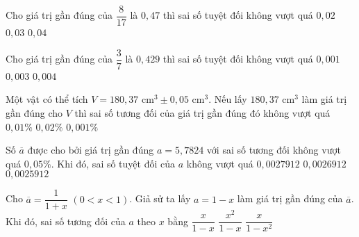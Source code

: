 \begin{ex}%
	Cho giá trị gần đúng của $\dfrac{8}{17}$ là $0{,}47$ thì sai số tuyệt đối không vượt quá 
	{$0{,}02$}
	{$0{,}03$}
	{$0{,}04$}
\end{ex}

\begin{ex}%
	Cho giá trị gần đúng của $\dfrac{3}{7}$ là $0{,}429$ thì sai số tuyệt đối không vượt quá 
	{\True $0{,}001$}
	{$ 0{,}003$}
	{$0{,}004$}
\end{ex}

\begin{ex}%
	Một vật có thể tích $V = 180{,}37 \text{\ cm}^3 \pm 0,05 \text{\ cm}^3$. Nếu lấy $180{,}37 \text{\ cm}^3$ làm giá trị gần đúng cho $V$ thì sai số tương đối của giá trị gần đúng đó không vượt quá 
	{$0{,}01 \%$}
	{$0{,}02 \%$}
	{$0{,}001 \%$}
\end{ex}

\begin{ex}%
	Số $\overline{a}$ được cho bởi giá trị gần đúng $a = 5{,}7824$ với sai số tương đối không vượt quá $0{,}05\%$. Khi đó, sai số tuyệt đối của $a$ không vượt quá
	{$0{,}0027912$}
	{$0{,}0026912$}
	{$0{,}0025912$}
\end{ex}

\begin{ex}%
	Cho $\overline{a} = \dfrac{1}{1+x}$ $(0 < x < 1)$. Giả sử ta lấy $a = 1- x$ làm giá trị gần đúng của $\overline{a}$. Khi đó, sai số tương đối của $a$ theo $x$ bằng
	{$\dfrac{x}{1-x}$}
	{$\dfrac{x^2}{1-x}$}
	{$\dfrac{x}{1-x^2}$}
\end{ex}

